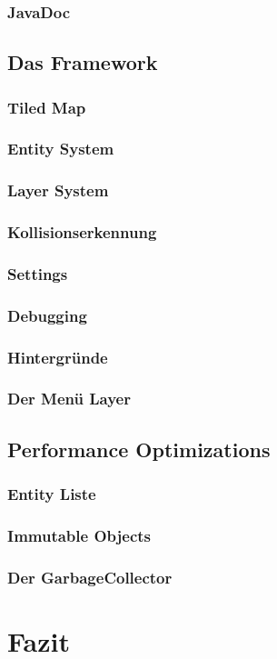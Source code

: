		\subsubsection{JavaDoc}						
	\subsection{Das Framework}
		\subsubsection{Tiled Map}					
		\subsubsection{Entity System}				
		\subsubsection{Layer System}				
		\subsubsection{Kollisionserkennung}			
		\subsubsection{Settings}					
		\subsubsection{Debugging}					
		\subsubsection{Hintergründe}				
		\subsubsection{Der Menü Layer}				
	\subsection{Performance Optimizations}			
		\subsubsection{Entity Liste}				
		\subsubsection{Immutable Objects}			
		\subsubsection{Der GarbageCollector}		
\section{Fazit}                                     
